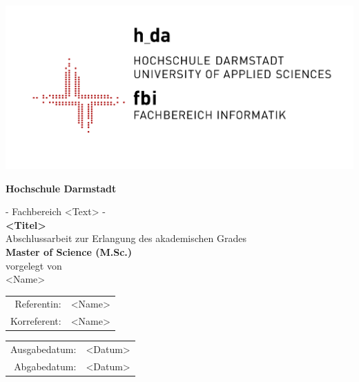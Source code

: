 
\begin{titlepage}
\begin{center}
\includegraphics[scale=1.5]{gfx/LG0_fbi_r5005_lzw.png}

\vspace{0.8cm}
{\sf

{\LARGE\textbf{Hochschule Darmstadt}}\\ 

{\Large - Fachbereich <Text> - \\ 

\vspace{2.0cm} 
{\Huge\textbf{<Titel>}}\\ 

\vspace{2.0cm}
Abschlussarbeit zur Erlangung des akademischen Grades\\
\textbf{Master of Science (M.Sc.)}\\ 

\vspace{1.0cm}
vorgelegt von\\ 
<Name>

\vspace{1.0cm} 
\begin{tabular}{rl} 
Referentin:& <Name>\\
Korreferent:& <Name>
\end{tabular}

\vspace{0.5cm}
\begin{tabular}{rl}
Ausgabedatum:& <Datum>\\
Abgabedatum:& <Datum>
\end{tabular}

} %

}

\end{center}
\end{titlepage}